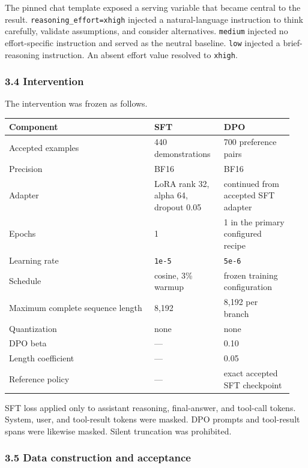 \documentclass[
]{article}
\newcounter{none} %
\begin{document}
The pinned chat template exposed a serving variable that became central
to the result. \texttt{reasoning\_effort=xhigh} injected a
natural-language instruction to think carefully, validate assumptions,
and consider alternatives. \texttt{medium} injected no effort-specific
instruction and served as the neutral baseline. \texttt{low} injected a
brief-reasoning instruction. An absent effort value resolved to
\texttt{xhigh}.

\subsubsection{3.4 Intervention}\label{34-intervention}

The intervention was frozen as follows.

{\def\LTcaptype{none} %
\begin{longtable}[]{@{}p{0.48\linewidth}p{0.23\linewidth}p{0.23\linewidth}@{}}
\toprule\noalign{}
Component & SFT & DPO \\
\midrule\noalign{}
\endhead
\bottomrule\noalign{}
\endlastfoot
Accepted examples & 440 demonstrations & 700 preference pairs \\
Precision & BF16 & BF16 \\
Adapter & LoRA rank 32, alpha 64, dropout 0.05 & continued from accepted
SFT adapter \\
Epochs & 1 & 1 in the primary configured recipe \\
Learning rate & \texttt{1e-5} & \texttt{5e-6} \\
Schedule & cosine, 3\% warmup & frozen training configuration \\
Maximum complete sequence length & 8,192 & 8,192 per branch \\
Quantization & none & none \\
DPO beta & --- & 0.10 \\
Length coefficient & --- & 0.05 \\
Reference policy & --- & exact accepted SFT checkpoint \\
\end{longtable}
}

SFT loss applied only to assistant reasoning, final-answer, and
tool-call tokens. System, user, and tool-result tokens were masked. DPO
prompts and tool-result spans were likewise masked. Silent truncation
was prohibited.

\subsubsection{3.5 Data construction and
acceptance}\label{35-data-construction-and-acceptance}
\end{document}
